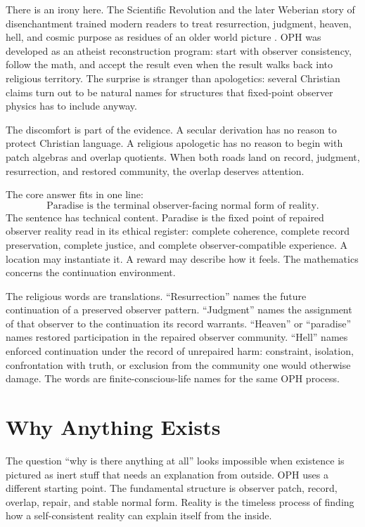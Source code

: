 \documentclass[11pt]{article}
\theoremstyle{remark}
\theoremstyle{plain}
\begin{document}
There is an irony here. The Scientific Revolution and the later Weberian story
of disenchantment trained modern readers to treat resurrection, judgment,
heaven, hell, and cosmic purpose as residues of an older world picture
\cite{Henry1997,Brooke1991,Weber1919}. OPH was developed as an atheist
reconstruction program: start with observer consistency, follow the math, and
accept the result even when the result walks back into religious territory. The
surprise is stranger than apologetics: several Christian claims turn out to be
natural names for structures that fixed-point observer physics has to include
anyway.

The discomfort is part of the evidence. A secular derivation has no reason to
protect Christian language. A religious apologetic has no reason to begin with
patch algebras and overlap quotients. When both roads land on record,
judgment, resurrection, and restored community, the overlap deserves attention.

The core answer fits in one line:
\[
\boxed{
\text{Paradise is the terminal observer-facing normal form of reality.}
}
\]
The sentence has technical content. Paradise is the fixed point of repaired
observer reality read in its ethical register: complete coherence, complete
record preservation, complete justice, and complete observer-compatible
experience. A location may instantiate it. A reward may describe how it feels.
The mathematics concerns the continuation environment.

The religious words are translations. ``Resurrection'' names the
future continuation of a preserved observer pattern. ``Judgment'' names the
assignment of that observer to the continuation its record warrants. ``Heaven''
or ``paradise'' names restored participation in the repaired observer
community. ``Hell'' names enforced continuation under the record of unrepaired
harm: constraint, isolation, confrontation with truth, or exclusion from the
community one would otherwise damage. The words are finite-conscious-life names
for the same OPH process.

\section{Why Anything Exists}

The question ``why is there anything at all'' looks impossible when existence
is pictured as inert stuff that needs an explanation from outside. OPH uses a
different starting point. The fundamental structure is observer patch, record,
overlap, repair, and stable normal form. Reality is the timeless process of
finding how a self-consistent reality can explain itself from the inside.
\end{document}
